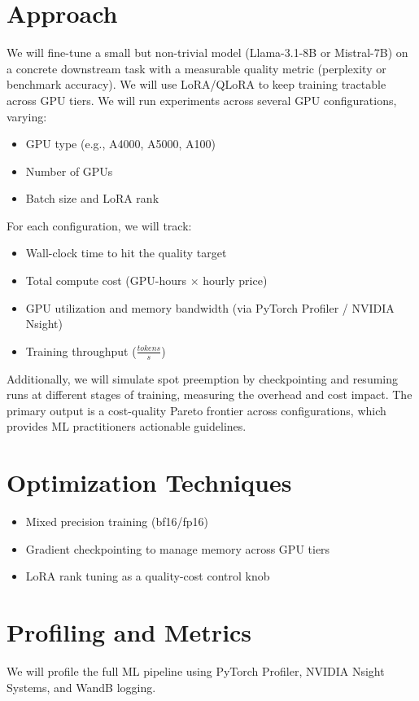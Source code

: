 \documentclass{article}
\begin{document}
\section{Approach}
\par We will fine-tune a small but non-trivial model (Llama-3.1-8B or Mistral-7B) on a concrete downstream task with a measurable quality metric (perplexity or benchmark accuracy). We will use LoRA/QLoRA to keep training tractable across GPU tiers.
We will run experiments across several GPU configurations, varying:
\begin{itemize}
    \item GPU type (e.g., A4000, A5000, A100)
    \item Number of GPUs
    \item Batch size and LoRA rank
\end{itemize}
For each configuration, we will track:
\begin{itemize}
    \item Wall-clock time to hit the quality target
    \item Total compute cost (GPU-hours $\times$ hourly price)
    \item GPU utilization and memory bandwidth (via PyTorch Profiler / NVIDIA Nsight)
    \item Training throughput ($\frac{tokens}{s}$)
\end{itemize}
Additionally, we will simulate spot preemption by checkpointing and resuming runs at different stages of training, measuring the overhead and cost impact. The primary output is a cost-quality Pareto frontier across configurations, which provides ML practitioners actionable guidelines.

\section{Optimization Techniques}
\begin{itemize}
    \item Mixed precision training (bf16/fp16)
    \item Gradient checkpointing to manage memory across GPU tiers
    \item LoRA rank tuning as a quality-cost control knob
\end{itemize}

\section{Profiling and Metrics}
\par We will profile the full ML pipeline using PyTorch Profiler, NVIDIA Nsight Systems, and WandB logging.
\end{document}
